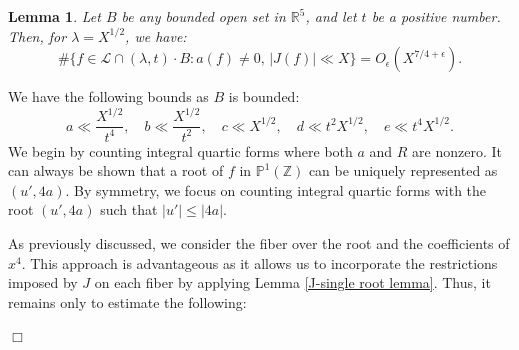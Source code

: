 \documentclass{article}
\newtheorem{lemma}[theorem]{Lemma}
\newenvironment{proof}{\noindent {\bf Proof:}}{$\Box$ \vspace{2 ex}}
\begin{document}
\begin{lemma}\label{nonzero-a-bounding}
    Let $B$ be any bounded open set in $\mathbb{R}^5$, and let $t$ be a positive number. Then, for $\lambda = X^{1/2}$, we have:
    \begin{equation*}
      \# \big\{ f \in \mathcal{L} \cap (\lambda,t) \cdot B : a(f) \neq 0, \,|J(f)| \ll X \big\} = O_{\epsilon}(X^{7/4+\epsilon}).
    \end{equation*}
\end{lemma}
\begin{proof}
    We have the following bounds as $B$ is bounded:
\begin{equation*}  
a \ll \frac{X^{1/2}}{t^4}, \quad b \ll \frac{X^{1/2}}{t^2}, \quad c \ll X^{1/2}, \quad d \ll t^2 X^{1/2}, \quad e \ll t^4 X^{1/2}.
\end{equation*}
We begin by counting integral quartic forms where both $a$ and $R$ are nonzero. It can always be shown that a root of $f$ in $\mathbb{P}^{1}(\mathbb{Z})$ can be uniquely represented as $(u', 4a)$. By symmetry, we focus on counting integral quartic forms with the root $(u', 4a)$ such that $|u'| 
\leq |4a|$. 

As previously discussed, we consider the fiber over the root and the coefficients of $x^4$. This approach is advantageous as it allows us to incorporate the restrictions imposed by $J$ on each fiber by applying Lemma \ref{J-single root lemma}. Thus, it remains only to estimate the following:


\end{proof}
\end{document}
